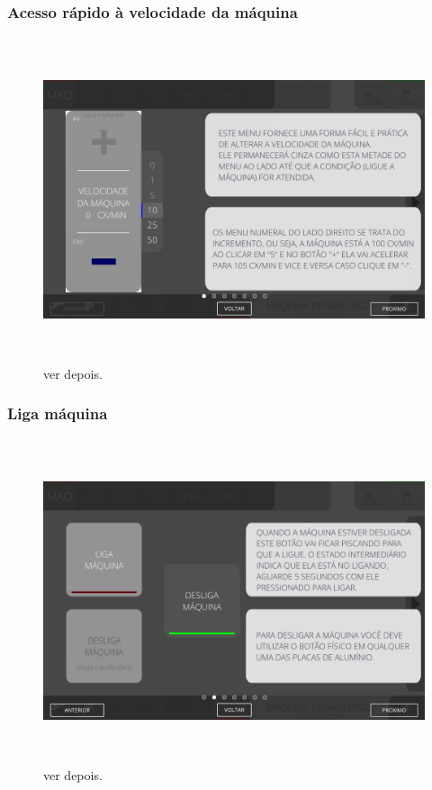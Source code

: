\subsubsection{\small{Acesso rápido à velocidade da máquina}}

\begin{figure}[h]
  \centering
  \includegraphics[width=576px,height=360px]{src/images/02-machine/e-1.png}
  \caption{ver depois.}
   \label{}
\end{figure}

\vspace*{\fill}

\newpage
\thispagestyle{fancy}

\vspace*{\fill}

\subsubsection{\small{Liga máquina}}

\begin{figure}[h]
  \centering
  \includegraphics[width=576px,height=360px]{src/images/02-machine/e-2.png}
  \caption{ver depois.}
   \label{}
\end{figure}

